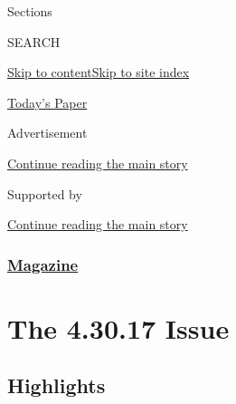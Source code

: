 Sections

SEARCH

\protect\hyperlink{site-content}{Skip to
content}\protect\hyperlink{site-index}{Skip to site index}

\href{https://myaccount.nytimes3xbfgragh.onion/auth/login?response_type=cookie\&client_id=vi}{}

\href{https://www.nytimes3xbfgragh.onion/section/todayspaper}{Today's
Paper}

Advertisement

\protect\hyperlink{after-top}{Continue reading the main story}

Supported by

\protect\hyperlink{after-sponsor}{Continue reading the main story}

\hypertarget{magazine}{%
\subsubsection{\texorpdfstring{\href{/section/magazine}{Magazine}}{Magazine}}\label{magazine}}

\hypertarget{the-43017-issue}{%
\section{The 4.30.17 Issue}\label{the-43017-issue}}

\hypertarget{highlights}{%
\subsection{Highlights}\label{highlights}}

